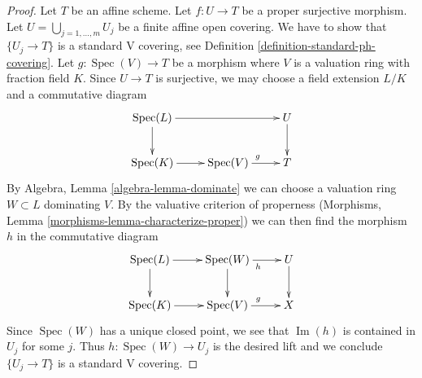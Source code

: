 \documentclass[10pt,a4paper]{amsart}
\theoremstyle{plain}
\theoremstyle{definition}
\theoremstyle{remark}
\numberwithin{equation}{subsection}
\def\Spec{\mathop{\mathrm{Spec}}}
\def\Im{\mathop{\mathrm{Im}}}
\begin{document}
\begin{proof}
Let $T$ be an affine scheme. Let $f : U \to T$ be a proper surjective
morphism. Let $U = \bigcup_{j = 1, \ldots, m} U_j$ be a finite
affine open covering. We have to show that $\{U_j \to T\}$
is a standard V covering, see
Definition \ref{definition-standard-ph-covering}.
Let $g : \Spec(V) \to T$
be a morphism where $V$ is a valuation ring with fraction field $K$.
Since $U \to T$ is surjective, we may choose a field extension
$L/K$ and a commutative diagram
$$
\xymatrix{
\Spec(L) \ar[rr] \ar[d] & & U \ar[d] \\
\Spec(K) \ar[r] & \Spec(V) \ar[r]^g & T
}
$$
By Algebra, Lemma \ref{algebra-lemma-dominate} we can choose a valuation ring
$W \subset L$ dominating $V$. By the valuative criterion of
properness (Morphisms, Lemma \ref{morphisms-lemma-characterize-proper})
we can then find the morphism $h$ in the commutative
diagram
$$
\xymatrix{
\Spec(L) \ar[r] \ar[d] & \Spec(W) \ar[r]_h \ar[d] & U \ar[d] \\
\Spec(K) \ar[r] & \Spec(V) \ar[r]^g & X
}
$$
Since $\Spec(W)$ has a unique closed point, we see that $\Im(h)$
is contained in $U_j$ for some $j$. Thus $h : \Spec(W) \to U_j$
is the desired lift and we conclude $\{U_j \to T\}$ is a standard V covering.
\end{proof}
\end{document}
